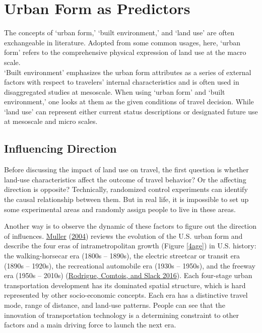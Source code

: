\documentclass[
  11pt,
  openany]{memoir}
\begin{document}
\hypertarget{form}{%
\chapter{Urban Form as Predictors}\label{form}}

The concepts of `urban form,' `built environment,' and `land use' are often exchangeable in literature. Adopted from some common usages, here, `urban form' refers to the comprehensive physical expression of land use at the macro scale.\\
`Built environment' emphasizes the urban form attributes as a series of external factors with respect to travelers' internal characteristics and is often used in disaggregated studies at mesoscale. When using `urban form' and `built environment,' one looks at them as the given conditions of travel decision. While `land use' can represent either current status descriptions or designated future use at mesoscale and micro scales.

\hypertarget{influencing-direction}{%
\section{Influencing Direction}\label{influencing-direction}}

Before discussing the impact of land use on travel, the first question is whether land-use characteristics affect the outcome of travel behavior? Or the affecting direction is opposite? Technically, randomized control experiments can identify the causal relationship between them. But in real life, it is impossible to set up some experimental areas and randomly assign people to live in these areas.

Another way is to observe the dynamic of these factors to figure out the direction of influences. \protect\hyperlink{ref-mullerTransportationUrbanForm2004}{Muller} (\protect\hyperlink{ref-mullerTransportationUrbanForm2004}{2004}) reviews the evolution of the U.S. urban form and describe the four eras of intrametropolitan growth (Figure \ref{4age}) in U.S. history: the walking-horsecar era (1800s -- 1890s), the electric streetcar or transit era (1890s -- 1920s), the recreational automobile era (1930s -- 1950s), and the freeway era (1950s -- 2010s) (\protect\hyperlink{ref-rodrigueGeographyTransportSystems2016}{Rodrigue, Comtois, and Slack 2016}). Each four-stage urban transportation development has its dominated spatial structure, which is hard represented by other socio-economic concepts. Each era has a distinctive travel mode, range of distance, and land-use patterns. People can see that the innovation of transportation technology is a determining constraint to other factors and a main driving force to launch the next era.
\end{document}
